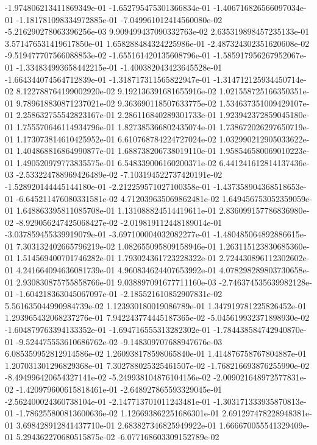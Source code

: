 -1.974806213411869349e-01
-1.652795475301366834e-01
-1.406716826566097034e-01
-1.181781098334972885e-01
-7.049961012414560080e-02
-5.216290278063396256e-03
9.909499437090332763e-02
2.635319898457235133e-01
3.571476531419617850e-01
1.658288484324225986e-01
-2.487324302351620608e-02
-9.519477707566088853e-02
-1.655161420135608796e-01
-1.585917956267952067e-01
-1.334834993658442215e-01
-1.400382043423645528e-01
-1.664344074564712839e-01
-1.318717311565822947e-01
-1.314712125934450714e-02
8.122788764199002920e-02
9.192136391681655916e-02
1.021558725166350351e-01
9.789618830871237021e-02
9.363690118507633775e-02
1.534637351009429107e-01
2.258632755542823167e-01
2.286116840289301733e-01
1.923942372859045180e-01
1.755570646114934796e-01
1.827385366802435074e-01
1.738672026297650719e-01
1.173073814610425952e-01
6.610768784224727024e-02
1.032990212905033622e-01
1.404868816864990877e-01
1.688738206738019110e-01
1.958546580069010223e-01
1.490520979773835575e-01
6.548339006160200371e-02
6.441241612814137436e-03
-2.533224788969426489e-02
-7.103194522737420191e-02
-1.528920144445144180e-01
-2.212259571027100358e-01
-1.437358904368518653e-01
-6.645211476080331581e-02
4.712039635069862481e-02
1.649456753052359059e-01
1.648863395811085708e-01
1.131088824514419611e-01
2.836099157786836980e-02
-8.929056247425068427e-02
-2.019819112448189014e-01
-3.037859455339919079e-01
-3.697100004032082277e-01
-1.480485064892886615e-01
7.303132402665796219e-02
1.082655095809158946e-01
1.263115123830685360e-01
1.514569400701746282e-01
1.793024361723228322e-01
2.724430896112302602e-01
4.241664094636081739e-01
4.960834624407653992e-01
4.078298289803730658e-01
2.930830875755858766e-01
9.038897091677711160e-03
-2.746374535639982128e-01
-1.604218363045067097e-01
-2.185521610852907831e-02
5.561635044990984739e-02
1.123930180019086789e-01
1.347919781225826452e-01
1.293965432068237276e-01
7.942243774445187365e-02
-5.045619932371898930e-02
-1.604879763394133352e-01
-1.694716555313282302e-01
-1.784438584742940870e-01
-9.524475553610686762e-02
-9.148309707688947676e-03
6.085359952812914586e-02
1.260938178598065840e-01
1.414876758767804887e-01
1.207031301296829368e-01
7.302788025325461507e-02
-1.768216693876255990e-02
-8.494996420654327141e-02
-5.249938104876104156e-02
-2.009021648972577831e-02
-1.420979600615818461e-01
-2.648927865593329045e-01
-2.562400024360738104e-01
-2.147713701011243481e-01
-1.303171333935870813e-01
-1.786255800813600636e-02
1.126693862251686301e-01
2.691297478228948381e-01
3.698428912841437710e-01
2.683827346825949922e-01
1.666670055541329409e-01
5.294362270680515875e-02
-6.077168603309152789e-02
